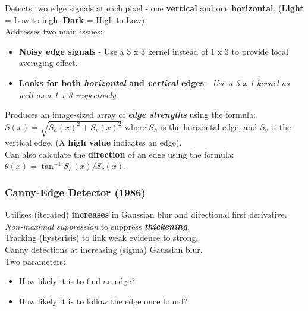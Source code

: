\documentclass[english, 10pt]{article}
\begin{document}
  Detects two edge signals at each pixel - one \textbf{vertical} and one
  \textbf{horizontal}. (\textbf{Light} = Low-to-high, \textbf{Dark} = High-to-Low).\\
  
  Addresses two main issues:

  \begin{itemize}
	
  \def\labelenumi{\arabic{enumi}.}
  \itemsep1pt\parskip0pt
  \item
    \textbf{Noisy edge signals} - Use a 3 x 3 kernel instead of 1 x 3 to provide local averaging effect.
  \item
    \textbf{Looks for both \emph{horizontal} and \emph{vertical} edges} -
    \emph{Use a 3 x 1 kernel as well as a 1 x 3 respectively}.
   \end{itemize}

  Produces an image-sized array of \textbf{\emph{edge strengths}} using
  the formula: $S(x) = \sqrt{S_h(x)^2 + S_v(x)^2}$ where $S_h$ is the horizontal edge, and $S_v$ is the vertical edge. (A \textbf{high value} indicates an edge). \\
  
  Can also calculate the \textbf{direction} of an edge using the
  formula: $\theta(x) = \tan^{-1}S_h(x) / S_v(x)$.

\subsubsection{Canny-Edge Detector
(1986)}\label{canny-edge-detector-1986}

  Utilises (iterated) \textbf{increases} in Gaussian blur and directional first derivative. \\

  \emph{Non-maximal suppression} to suppress \textbf{\emph{thickening}}. \\
  
  Tracking (hysterisis) to link weak evidence to strong. \\
  
  Canny detections at increasing (sigma) Gaussian blur. \\
  
 Two parameters:
 \begin{itemize}
 \item How likely it is to find an edge?
 \item How likely it is to follow the edge once found?
 \end{itemize}
\end{document}
